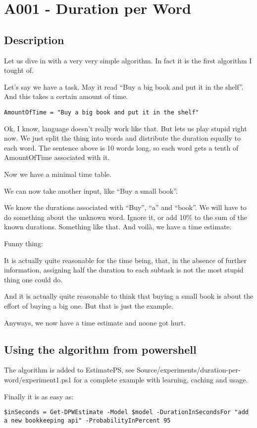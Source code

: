 \newpage{}

\hypertarget{a001---duration-per-word}{%
\section{A001 - Duration per Word}\label{a001---duration-per-word}}

\hypertarget{description}{%
\subsection{Description}}

Let us dive in with a very very simple algorithm. In fact it is the
first algorithm I tought of.

Let's say we have a task. May it read ``Buy a big book and put it in the
shelf''. And this takes a certain amount of time.

\begin{verbatim}
AmountOfTime = "Buy a big book and put it in the shelf"
\end{verbatim}

Ok, I know, language doesn't really work like that. But lets us play
stupid right now. We just split the thing into words and distribute the
duration equally to each word. The sentence above is 10 words long, so
each word gets a tenth of AmountOfTime associated with it.

Now we have a minimal time table.

We can now take another input, like ``Buy a small book''.

We know the durations associated with ``Buy'', ``a'' and ``book''. We
will have to do something about the unknown word. Ignore it, or add 10\%
to the sum of the known durations. Something like that. And voilà, we
have a time estimate.

Funny thing:

It is actually quite reasonable for the time being, that, in the absence
of further information, assigning half the duration to each subtask is
not the most stupid thing one could do.

And it is actually quite reasonable to think that buying a small book is
about the effort of buying a big one. But that is just the example.

Anyways, we now have a time estimate and noone got hurt.

\hypertarget{using-the-algorithm-from-powershell}{%
\subsection{Using the algorithm from powershell}}

The algorithm is added to EstimatePS, see
Source/experiments/duration-per-word/experiment1.ps1 for a complete
example with learning, caching and usage.

Finally it is as easy as:

\begin{verbatim}
$inSeconds = Get-DPWEstimate -Model $model -DurationInSecondsFor "add a new bookkeeping api" -ProbabilityInPercent 95
\end{verbatim}

